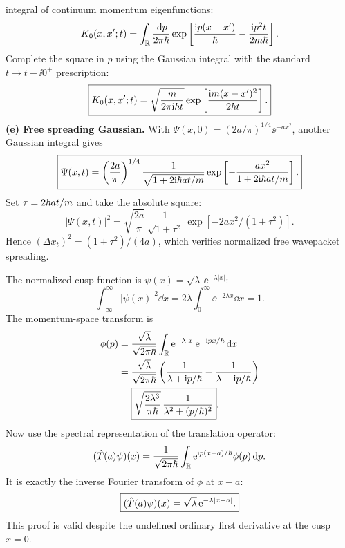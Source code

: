 integral of continuum momentum
eigenfunctions:
\[
K_0(x,x';t)=\int_{\mathbb R}
\frac{\,\mathrm d p}{2\pi\hbar}
\exp\left[\frac{\mathrm i p(x-x')}{\hbar}
-\frac{\mathrm i p^2t}{2m\hbar}\right].
\]
Complete the square in $p$
using the Gaussian integral with
the standard $t\to t-\ii0^+$
prescription:
\begin{equation}
\boxed{K_0(x,x';t)=
\sqrt{\frac{m}{2\pi\mathrm i\hbar t}}
\exp\left[\frac{\mathrm i m(x-x')^2}{2\hbar t}\right].}
\end{equation}
\textbf{(e) Free spreading Gaussian.}
With $\Psi(x,0)=(2a/\pi)^{1/4}\ee^{-ax^2}$,
another Gaussian integral gives
\begin{equation}
\boxed{\Psi(x,t)=
\left(\frac{2a}{\pi}\right)^{1/4}
\frac{1}{\sqrt{1+2\mathrm i\hbar at/m}}
\exp\left[-\frac{ax^2}{
1+2\mathrm i\hbar at/m}\right].}
\end{equation}
Set $\tau=2\hbar at/m$ and take the
absolute square:
\[
|\Psi(x,t)|^2=
\sqrt{\frac{2a}{\pi}}\,
\frac{1}{\sqrt{1+\tau^2}}\,
\exp[-2ax^2/(1+\tau^2)].
\]
Hence
$\boxed{(\Delta x_t)^2=
(1+\tau^2)/(4a)}$,
which verifies normalized free
wavepacket spreading.

The normalized cusp function is
$\psi(x)=\sqrt\lambda\,\ee^{-\lambda|x|}$:
\[
\int_{-\infty}^{\infty}|\psi(x)|^2\dd x
=2\lambda\int_0^\infty
\ee^{-2\lambda x}\dd x=1.
\]
The momentum-space transform is
\begin{align}
\phi(p)&=\frac{\sqrt\lambda}{\sqrt{2\pi\hbar}}
\int_{\mathbb R}
\mathrm e^{-\lambda|x|}\mathrm e^{-\mathrm i px/\hbar}\,\mathrm d x\\
&=\frac{\sqrt\lambda}{\sqrt{2\pi\hbar}}
\left(\frac1{\lambda+\mathrm i p/\hbar}
+\frac1{\lambda-\mathrm i p/\hbar}\right)\\
&=\boxed{\sqrt{\frac{2\lambda^3}{\pi\hbar}}\,
\frac1{\lambda^2+(p/\hbar)^2}}.
\end{align}
Now use the spectral representation of
the translation operator:
\[
(\hat T(a)\psi)(x)=
\frac1{\sqrt{2\pi\hbar}}\int_{\mathbb R}
\mathrm e^{\mathrm i p(x-a)/\hbar}\phi(p)\,\mathrm d p.
\]
It is exactly the inverse Fourier
transform of $\phi$ at $x-a$:
\begin{equation}
\boxed{(\hat T(a)\psi)(x)=
\sqrt\lambda\,\mathrm e^{-\lambda|x-a|}.}
\end{equation}
This proof is valid despite the
undefined ordinary first derivative
at the cusp $x=0$.

